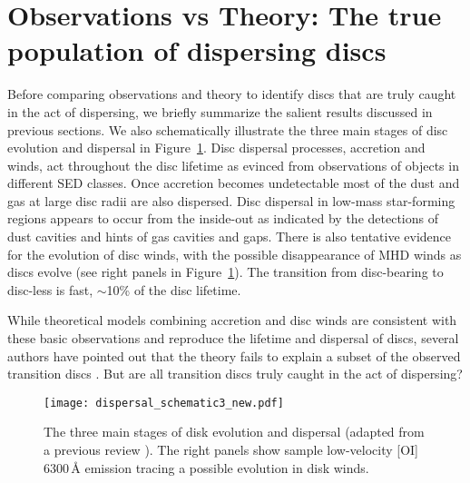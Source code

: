\documentclass{rsos}
\begin{document}
\section{Observations vs Theory: The true population of dispersing discs}\label{sect:thevsobs}
Before comparing observations and theory to identify discs that are truly caught in the act of dispersing, we briefly summarize the salient results discussed in previous sections. We also schematically illustrate the three main stages of disc evolution and dispersal in Figure~\ref{fig:ddisp}.
Disc dispersal processes, accretion and winds, act throughout the disc lifetime as evinced from observations of objects in different SED classes.
Once accretion becomes undetectable most of the dust and gas at large disc radii are also dispersed.
Disc dispersal in low-mass star-forming regions appears to occur from the inside-out as indicated by the detections of dust cavities and hints of gas cavities and gaps. There is also tentative evidence for the evolution of disc winds, with the possible disappearance of MHD winds as discs evolve (see right panels in Figure~\ref{fig:ddisp}).
The transition from disc-bearing to disc-less is fast, $\sim$10\% of the disc lifetime. 

While theoretical models combining accretion and disc winds are consistent with these basic observations and reproduce the lifetime and dispersal of discs, several authors have pointed out that the theory fails to explain a subset of the observed transition discs 
\cite{2016PASA...33....5O}.
But are all transition discs truly caught in the act of dispersing?


\begin{figure}[h]
\centering
\texttt{[image: dispersal\_schematic3\_new.pdf]}
\caption{The three main stages of disk evolution and dispersal (adapted from a previous review \cite{2014prpl.conf..475A}). The right panels show sample low-velocity [OI] 6300\,\AA{} emission \cite{2016ApJ...831..169S} tracing a possible evolution in disk winds.}\label{fig:ddisp}
\end{figure}
\end{document}
